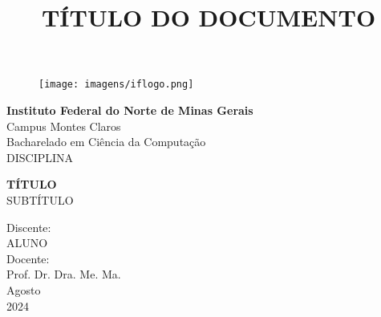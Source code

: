 \documentclass[article]{abntex2}
\begin{document}
\title{TÍTULO DO DOCUMENTO}


\begin{titlepage}
	\begin{center}
		\begin{figure}[htb!]
			\begin{flushleft}
				\texttt{[image: imagens/iflogo.png]}
			\end{flushleft}
		\end{figure}
        \vspace{-2.5cm}
        \hspace{2.1cm}\Large{\textbf{Instituto Federal do Norte de Minas Gerais}}\\
        \hspace{2.1cm}\Large{Campus Montes Claros}\\
        \hspace{2.1cm}\Large{Bacharelado em Ciência da Computação}\\
        \hspace{2.1cm}\Large{DISCIPLINA}\\
        
        \vspace{200pt}
        
        \LARGE{\textbf{TÍTULO}}\\ %
        \Large{SUBTÍTULO}\\ %
        
        \vspace{100pt}
        
        
        \vspace{30pt}
        \hfill {Discente:}\\
        \hfill ALUNO\\

        \vspace{25pt}
        \hfill {Docente:}\\
        \hfill Prof. Dr. Dra. Me. Ma. \\ %
        
        
        \vspace{\fill}
        \vspace{5pt}
        Agosto\\
        2024
          
	\end{center}
\end{titlepage}
\end{document}

